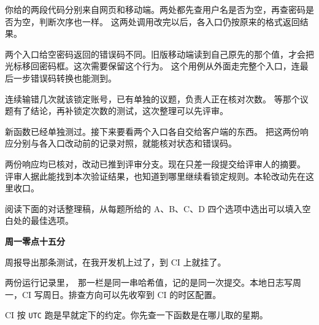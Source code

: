 \documentclass[UTF8, zihao=5, a4paper, fontset=fandol]{ctexart}
\begin{document}
\smallskip
\noindent\arole 你给的两段代码分别来自网页和移动端。两处都先查用户名是否为空，再查密码是否为空，判断次序也一样。 这两处调用改完以后，各入口仍按原来的格式返回结果。

两个入口给空密码返回的错误码不同。旧版移动端读到自己原先的那个值，才会把光标移回密码框。这次需要保留这个行为。 这个用例从外面走完整个入口，连最后一步错误码转换也能测到。

连续输错几次就该锁定账号，已有单独的议题，负责人正在核对次数。 等那个议题有了结论，再补锁定次数的测试，这次整理可以先评审。

新函数已经单独测过。接下来要看两个入口各自交给客户端的东西。 把这两份响应分别与各入口改动前的记录对照，就能核对状态和错误码。

两份响应均已核对，改动已推到评审分支。现在只差一段提交给评审人的摘要。 评审人据此能找到本次验证结果，也知道到哪里继续看锁定规则。本轮改动先在这里收口。




阅读下面的对话整理稿，从每题所给的 A、B、C、D 四个选项中选出可以填入空白处的最佳选项。

\begin{center}
{\heiti\bfseries 周一零点十五分}
\end{center}

\noindent\urole 周报导出那条测试，在我开发机上过了，到 CI 上就挂了。

\noindent\arole 两份运行记录里，~那一栏是同一串哈希值，记的是同一次提交。本地日志写周一，CI 写周日。排查方向可以先收窄到 CI 的时区配置。

\noindent\urole CI 按 \texttt{UTC} 跑是早就定下的约定。你先查一下函数是在哪儿取的星期。
\end{document}

